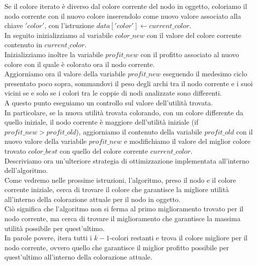 Se il colore iterato è diverso dal colore corrente del nodo in oggetto, coloriamo il nodo corrente con il nuovo colore inserendolo come nuovo valore associato alla chiave $'color'$, con l'istruzione $data['color']\gets current\_color$.\\
In seguito inizializziamo al variabile $color\_new$ con il valore del colore corrente contenuto in $current\_color$.\\
Inizializziamo inoltre la variabile $profit\_new$ con il profitto associato al nuovo colore con il quale è colorato ora il nodo corrente.\\

Aggiorniamo ora il valore della variabile $profit\_new$ eseguendo il medesimo ciclo presentato poco sopra, sommandovi il peso degli archi tra il nodo corrente e i suoi vicini se e solo se i colori tra le coppie di nodi analizzate sono differenti.\\

A questo punto eseguiamo un controllo sul valore dell'utilità trovata.\\ 
In particolare, se la nuova utilità trovata colorando, con un colore differente da quello iniziale, il nodo corrente è maggiore dell'utilità iniziale (if $profit\_new > profit\_old$), aggiorniamo il contenuto della variabile $profit\_old$ con il nuovo valore della variabile $profit\_new$ e modifichiamo il valore del miglior colore trovato $color\_best$ con quello del colore corrente $current\_color$.\\

Descriviamo ora un'ulteriore strategia di ottimizzazione implementata all'interno dell'algoritmo.\\
Come vedremo nelle prossime istruzioni, l'algoritmo, preso il nodo e il colore corrente iniziale, cerca di trovare il colore che garantisce la migliore utilità all'interno della colorazione attuale per il nodo in oggetto.\\
Ciò significa che l'algoritmo non si ferma al primo miglioramento trovato per il nodo corrente, ma cerca di trovare il miglioramento che garantisce la massima utilità possibile per quest'ultimo.\\
In parole povere, itera tutti i $k-1$-colori restanti e trova il colore migliore per il nodo corrente, ovvero quello che garantisce il miglior profitto possibile per quest'ultimo all'interno della colorazione attuale.\\

